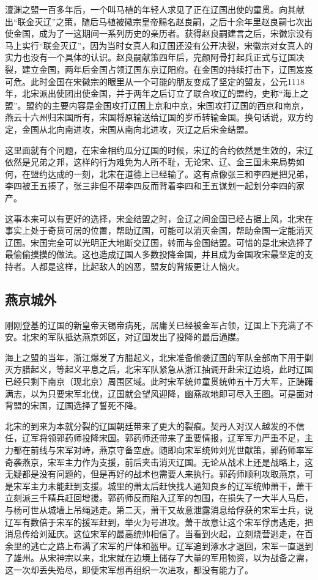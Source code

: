 \documentclass[
]{book}
\begin{document}
澶渊之盟一百多年后，一个叫马植的年轻人求见了正在辽国出使的童贯。向其献出``联金灭辽''之策，随后马植被徽宗皇帝赐名赵良嗣，之后十余年里赵良嗣七次出使金国，成为了一这期间一系列历史的亲历者。获得赵良嗣建言之后，宋徽宗没有马上实行``联金灭辽''，因为当时女真人和辽国还没有公开决裂，宋徽宗对女真人的实力也没有一个具体的认识。赵良嗣献策四年后，完颜阿骨打起兵正式与辽国决裂，建立金国，两年后金国占领辽国东京辽阳府。在金国的持续打击下，辽国岌岌可危。此时金国在宋徽宗的眼里从一个可能的朋友变成了坚定的盟友，公元1118年，北宋派出使团出使金国，并于两年之后订立了联合攻辽的盟约，史称``海上之盟''。盟约的主要内容是金国攻打辽国上京和中京，宋国攻打辽国的西京和南京，燕云十六州归宋国所有，宋国将原输送给辽国的岁币转输金国。换句话说，双方约定，金国从北向南进攻，宋国从南向北进攻，灭辽之后宋金结盟。

这里面就有个问题，在宋金相约瓜分辽国的时候，宋辽的合约依然是生效的，宋辽依然是兄弟之邦，这样的行为难免为人所不耻，无论宋、辽、金三国未来局势如何，在盟约达成的一刻，北宋在道德上已经输了。这有点像张三和李四是把兄弟，李四被王五揍了，张三非但不帮李四反而背着李四和王五谋划一起划分李四的家产。

这事本来可以有更好的选择，宋金结盟之时，金辽之间金国已经占据上风，北宋在事实上处于奇货可居的位置，帮助辽国，可能可以消灭金国，帮助金国一定能消灭辽国。宋国完全可以光明正大地断交辽国，转而与金国结盟。可惜的是北宋选择了最偷偷摸摸的做法。这也造成辽国人多数投降金国，并且成为金国攻宋最坚定的支持者。人都是这样，比起敌人的凶恶，盟友的背叛更让人恼火。

\hypertarget{ux71d5ux4eacux57ceux5916}{%
\subsection{燕京城外}\label{ux71d5ux4eacux57ceux5916}}

刚刚登基的辽国的新皇帝天锡帝病死，居庸关已经被金军占领，辽国上下充满了不安。北宋的军队抵达燕京郊区，对辽国发出了投降的最后通牒。

海上之盟的当年，浙江爆发了方腊起义，北宋准备偷袭辽国的军队全部南下用于剿灭方腊起义，等起义平息之后，北宋军队紧急从浙江抽调开赴宋辽边境，此时辽国已经只剩下南京（现北京）周围区域。此时宋军统帅童贯统帅五十万大军，正踌躇满志，以为只要宋军北伐，辽国就会望风迎降，幽燕故地即可尽入王图。可是面对背盟的宋国，辽国选择了誓死不降。

北宋的到来为本就分裂的辽国朝廷带来了更大的裂痕。契丹人对汉人越发的不信任，辽军将领郭药师投降宋国。郭药师还带来了重要情报，辽军军力严重不足，主力都在前线与宋军对峙，燕京守备空虚。随即向宋军统帅刘光世献策，郭药师率军奇袭燕京，宋军主力作为支援，前后夹击消灭辽国。无论从战术上还是战略上，这无疑都是没有问题的，但是再好的战术也需要人来执行。郭药师顺利攻取燕京，可是宋军主力未能赶到支援。城里的萧太后赶快找人通知良乡的辽军统帅萧干，萧干立刻派三千精兵赶回增援。郭药师反而陷入辽军的包围，在损失了一大半人马后，与杨可世从城墙上吊绳逃走。第二天，萧干又故意泄露消息给俘获的宋军士兵，说辽军有数倍于宋军的援军赶到，举火为号进攻。萧干故意让这个宋军俘虏逃走，把消息传给刘延庆。这位宋军的最高统帅相信了。当看到火起，立刻烧营逃走，在百余里的逃亡之路上布满了宋军的尸体和盔甲。辽军追到涿水才退回，宋军一直退到了雄州。从宋神宗以来，北宋就在边境上储存了大量的军用物资，以为战备之需，这一次却丢失殆尽，即便宋军想再组织一次进攻，都没有能力了。
\end{document}
